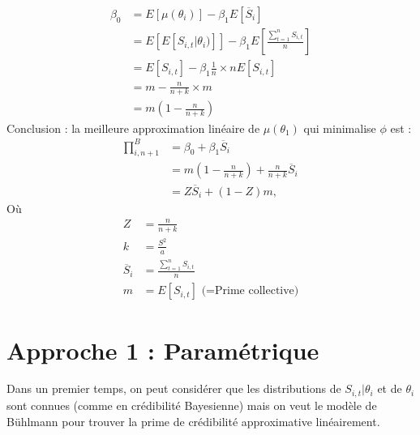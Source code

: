\begin{align*}
\beta_0 &= E[\mu(\theta_i)] - \beta_1 E[\overline{S}_i] \\
&= E[E[S_{i,t}|\theta_i)]] - \beta_1 E[\frac{\sum_{t=1}^{n} S_{i,t}}{n}] \\
&= E[S_{i,t}] - \beta_1 \frac{1}{n} \times n E[S_{i,t}] \\
&= m - \frac{n}{n+k} \times m \\
&= m (1 - \frac{n}{n+k})
\end{align*}
Conclusion : la meilleure approximation linéaire de $\mu(\theta_1)$ qui minimalise $\phi$ est :
\begin{align*}
\prod_{i,n+1}^{B} &= \beta_0 + \beta_1 \overline{S}_i \\
&= m (1 - \frac{n}{n+k}) +  \frac{n}{n+k} \overline{S}_i \\
&= Z \overline{S}_i + (1 -Z)m,
\end{align*}
Où 
\begin{align*}
Z &=  \frac{n}{n+k} \\
k &= \frac{S^2}{a}\\
\overline{S}_i &= \frac{\sum_{t=1}^{n} S_{i,t}}{n} \\
m &= E[S_{i,t}]  \text{ (=Prime collective)}
\end{align*}

\section{Approche 1 : Paramétrique}
Dans un premier temps, on peut considérer que les distributions de $S_{i,t}|\theta_i$ et de $\theta_i$ sont connues (comme en crédibilité Bayesienne) mais on veut le modèle de Bühlmann pour trouver la prime de crédibilité approximative linéairement.

